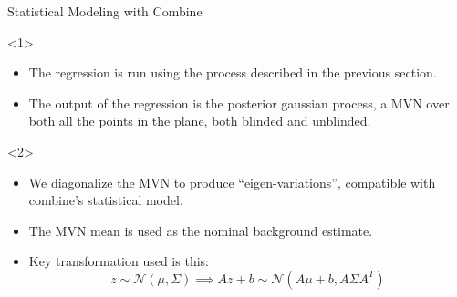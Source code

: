 \documentclass[10pt]{beamer}
\begin{document}
\begin{frame}[fragile, label=current]{Statistical Modeling with Combine}
  \begin{center}
  \end{center} 
  \begin{overlayarea}{\textwidth}{0.8\textwidth}
    \begin{center}
      \begin{onlyenv}<1>
        \begin{itemize}
        \item The regression is run using the process described in the previous section.
        \item The output of the regression is the posterior gaussian process, a MVN over both all the points in the plane, both blinded and unblinded.
        \end{itemize}
      \end{onlyenv}
      \begin{onlyenv}<2>
        \begin{itemize}
        \item We diagonalize the MVN to produce ``eigen-variations'', compatible with combine's statistical model.
        \item The MVN mean is used as the nominal background estimate.
        \item Key transformation used is this:
          \begin{equation}
            z \sim \mathcal{N} \left( \mu,\Sigma \right) \implies  A z + b \sim \mathcal{N} \left( A \mu + b , A \Sigma A^{T} \right)
          \end{equation}


\end{itemize}
\end{onlyenv}
\end{center}
\end{overlayarea}
\end{frame}
\end{document}
